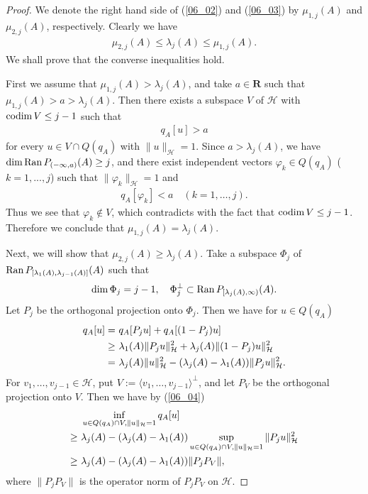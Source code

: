 \documentclass[12pt,a4paper]{article}
\def\Ran{\mathop{\rm Ran}\nolimits}
\def\codim{\mathop{\rm codim}\nolimits}
\begin{document}
\begin{proof}
 We denote the right hand side of 
(\ref{06_02}) and (\ref{06_03})
by $\mu_{1,j}(A)$ and $\mu_{2,j}(A)$,
respectively. 
Clearly we have
\begin{align*}
\mu_{2,j}(A)\leq \lambda_j(A)\leq \mu_{1,j}(A).
\end{align*}
We shall prove that the converse inequalities hold.

First we assume that 
$\mu_{1,j}(A)>\lambda_j(A)$,
and take $a\in \mathbf{R}$ such that $\mu_{1,j}(A)>a>\lambda_j(A)$.
Then there exists a subspace $V$ of $\mathcal{H}$ 
with $\codim V\leq j-1$ 
such that
\begin{align*}
 q_A[u]> a
\end{align*}
for every $u\in V\cap Q(q_A)$ with $\|u\|_{\mathcal{H}}=1$.
Since $a> \lambda_j(A)$, 
we have $\dim\Ran P_{(-\infty,a)}(A)\geq j$,
and there exist independent vectors 
$\varphi_k\in Q(q_A)$ ($k=1,...,j$) such that $\|\varphi_k\|_{\mathcal{H}}=1$
and 
\begin{align*}
 q_A[\varphi_k]<a\quad (k=1,\ldots,j).
\end{align*}
Thus we see that $\varphi_k\not\in V$,
which contradicts with the fact that $\codim V\leq j-1$.
Therefore we conclude that $\mu_{1,j}(A)=\lambda_j(A)$.

Next, we will show that $\mu_{2,j}(A)\geq \lambda_j(A)$.
Take a subspace $\Phi_j$ of
$\Ran P_{[\lambda_1(A), \lambda_{j-1}(A)]}(A)$
such that 
\begin{align*}
\dim \Phi_j= j-1,\quad 
\Phi_j^\bot \subset \Ran P_{[\lambda_j(A),\infty)}(A).
\end{align*}
Let $P_j$ be the orthogonal projection onto $\Phi_j$.
Then we have for $u\in Q(q_A)$
\begin{align}
 q_A[u]=&\ 
q_A[P_j u]+q_A[(1-P_j) u]\notag\\
\geq&\ 
\lambda_1(A)\|P_j u\|_{\mathcal{H}}^2
+\lambda_j(A)\|(1-P_j) u\|_{\mathcal{H}}^2\notag\\
=&\ 
\lambda_j(A)\|u\|_{\mathcal{H}}^2
-(\lambda_j(A)-\lambda_1(A))\|P_j u\|_{\mathcal{H}}^2.
\label{06_04}
\end{align}
For $v_1,\ldots,v_{j-1}\in \mathcal{H}$,
put $V:=\langle v_1,\ldots,v_{j-1}\rangle^\bot$,
and let $P_V$ be the orthogonal projection onto $V$.
Then we have by (\ref{06_04})
\begin{align}
&\ 
 \inf_{u\in Q(q_A)\cap V,\|u\|_{\mathcal{H}}=1}q_A[u]\notag\\
\geq 
&\ 
\lambda_j(A)-(\lambda_j(A)-\lambda_1(A))
 \sup_{u\in Q(q_A)\cap V,\|u\|_{\mathcal{H}}=1}
\|P_j u\|_{\mathcal{H}}^2\notag\\
\geq&\ 
\lambda_j(A)-(\lambda_j(A)-\lambda_1(A))\|P_jP_V\|,
\label{06_05}
\end{align}
where $\|P_jP_V\|$
is the operator norm of $P_jP_V$ on $\mathcal{H}$.


\end{proof}
\end{document}
